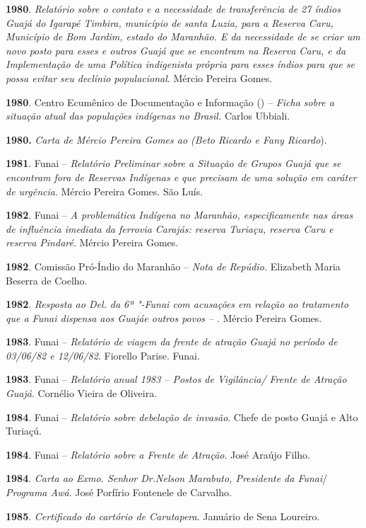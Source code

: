 \begin{Parskip}
\textbf{1980}. \emph{Relatório sobre o contato e a necessidade de
transferência de 27 índios Guajá do Igarapé Timbira, município de santa
Luzia, para a Reserva Caru, Município de Bom Jardim, estado do Maranhão.
E da necessidade de se criar um novo posto para esses e outros Guajá que
se encontram na Reserva Caru, e da Implementação de uma Política
indigenista própria para esses índios para que se possa evitar seu
declínio populacional}. Mércio Pereira Gomes.

\textbf{1980}. Centro Ecumênico de Documentação e Informação () --
\emph{Ficha sobre a situação atual das populações indígenas no Brasil.}
Carlos Ubbiali.

\textbf{1980.} \emph{Carta de Mércio Pereira Gomes ao  (Beto Ricardo
e Fany Ricardo}).

\textbf{1981}. Funai -- \emph{Relatório Preliminar sobre a Situação de
Grupos Guajá que se encontram fora de Reservas Indígenas e que precisam
de uma solução em caráter de urgência}. Mércio Pereira Gomes. São Luís.

\textbf{1982}. Funai -- \emph{A problemática Indígena no Maranhão,
especificamente nas áreas de influência imediata da ferrovia Carajás:
reserva Turiaçu, reserva Caru e reserva Pindaré}. Mércio Pereira Gomes.

\textbf{1982}. Comissão Pró-Índio do Maranhão -- \emph{Nota de Repúdio.}
Elizabeth Maria Beserra de Coelho.

\textbf{1982}. \emph{Resposta ao Del. da 6ª "-Funai com acusações em
relação ao tratamento que a Funai dispensa aos Guajáe outros povos --
}. Mércio Pereira Gomes.

\textbf{1983}. Funai -- \emph{Relatório de viagem da frente de atração
Guajá no período de 03/06/82 e 12/06/82}. Fiorello Parise. Funai.

\textbf{1983}. Funai -- \emph{Relatório anual 1983 -- Postos de
Vigilância/ Frente de Atração Guajá}. Cornélio Vieira de Oliveira.

\textbf{1984}. Funai -- \emph{Relatório sobre debelação de invasão}.
Chefe de posto Guajá e Alto Turiaçú.

\textbf{1984}. Funai -- \emph{Relatório sobre a Frente de Atração}. José
Araújo Filho.

\textbf{1984}. \emph{Carta ao Exmo. Senhor Dr.Nelson Marabuto,
Presidente da Funai}/ \emph{Programa Awá}. José Porfírio Fontenele de
Carvalho.

\textbf{1985}. \emph{Certificado do cartório de Carutapera}. Januário de
Sena Loureiro.


\end{Parskip}
